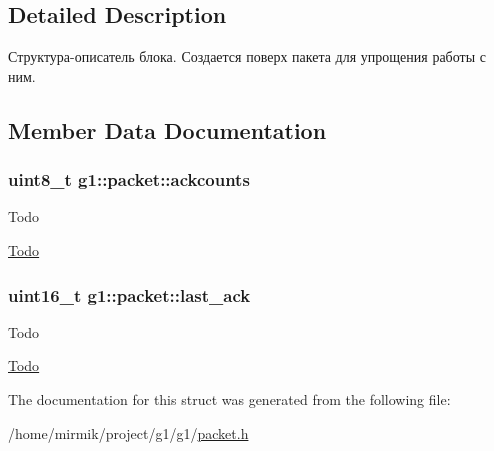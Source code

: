 \subsection{Detailed Description}
Структура-\/описатель блока. Создается поверх пакета для упрощения работы с ним. 

\subsection{Member Data Documentation}
\subsubsection[{\texorpdfstring{ackcounts}{ackcounts}}]{\setlength{\rightskip}{0pt plus 5cm}uint8\+\_\+t g1\+::packet\+::ackcounts}\hypertarget{structg1_1_1packet_a885a0ecdce163a529a58cc9b53ff323b}{}\label{structg1_1_1packet_a885a0ecdce163a529a58cc9b53ff323b}
\begin{DoxyRefDesc}{Todo}
\item[\hyperlink{todo__todo000002}{Todo}]\end{DoxyRefDesc}
\subsubsection[{\texorpdfstring{last\+\_\+ack}{last_ack}}]{\setlength{\rightskip}{0pt plus 5cm}uint16\+\_\+t g1\+::packet\+::last\+\_\+ack}\hypertarget{structg1_1_1packet_a3a260b0ab8300cd034be8a023ff8189d}{}\label{structg1_1_1packet_a3a260b0ab8300cd034be8a023ff8189d}
\begin{DoxyRefDesc}{Todo}
\item[\hyperlink{todo__todo000001}{Todo}]\end{DoxyRefDesc}


The documentation for this struct was generated from the following file\+:\begin{DoxyCompactItemize}
\item 
/home/mirmik/project/g1/g1/\hyperlink{packet_8h}{packet.\+h}\end{DoxyCompactItemize}
